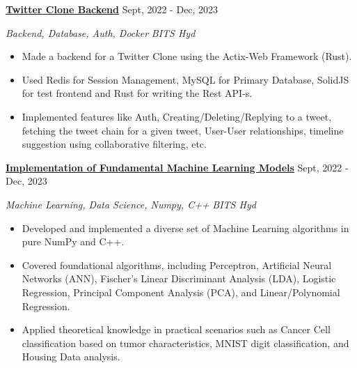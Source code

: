 \documentclass[a4paper,12pt]{report}
\begin{document}
\noindent
\textbf{\href{https://github.com/MSSRPRAD/twitter-clone}{\color{black}Twitter Clone Backend}} \hfill  {\fontsize{12pt}{12pt}\selectfont Sept, 2022 - Dec, 2023} \par
\par
\noindent 
{\fontsize{12pt}{12pt}\selectfont \textit{Backend, Database, Auth, Docker}\hfill\textit{ BITS Hyd}} \par
\noindent 
\begin{itemize}[noitemsep,topsep=0pt]
    \item {\fontsize{12pt}{12pt}\selectfont Made a backend for a Twitter Clone using the Actix-Web Framework (Rust).} \par
    \item {\fontsize{12pt}{12pt}\selectfont Used Redis for Session Management, MySQL for Primary Database, SolidJS for test frontend and Rust for writing the Rest API-s.} \par
    \item {\fontsize{12pt}{12pt}\selectfont Implemented features like Auth, Creating/Deleting/Replying to a tweet, fetching the tweet chain for a given tweet, User-User relationships, timeline suggestion using collaborative filtering, etc.} \par
\end{itemize}

\noindent 
\textbf{\href{https://github.com/MSSRPRAD/DS-Algorithms}{\color{black}Implementation of Fundamental Machine Learning Models}} \hfill  {\fontsize{12pt}{12pt}\selectfont Sept, 2022 - Dec, 2023} \par
\noindent
{\fontsize{12pt}{12pt}\selectfont \textit{Machine Learning, Data Science, Numpy, C++}\hfill\textit{ BITS Hyd}} \par
\noindent 
\begin{itemize}[noitemsep,topsep=0pt]
    \item {\fontsize{12pt}{12pt}\selectfont Developed and implemented a diverse set of Machine Learning algorithms in pure NumPy and C++.}  \par
    \item {\fontsize{12pt}{12pt}\selectfont Covered foundational algorithms, including Perceptron, Artificial Neural Networks (ANN), Fischer's Linear Discriminant Analysis (LDA), Logistic Regression, Principal Component Analysis (PCA), and Linear/Polynomial Regression.}  \par
    \item {\fontsize{12pt}{12pt}\selectfont Applied theoretical knowledge in practical scenarios such as Cancer Cell classification based on tumor characteristics, MNIST digit classification, and Housing Data analysis.}  \par
\end{itemize}
\end{document}
